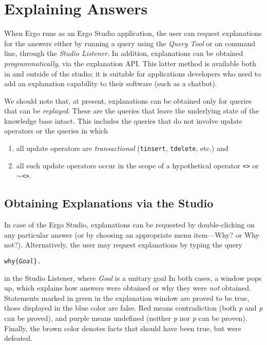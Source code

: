 
\section{Explaining Answers}\label{sec-expl-answers}

When Ergo runs as an Ergo Studio application,
the user can request explanations for the answers either by running a query
using the \emph{Query Tool}  or on command line, through the \emph{Studio
Listener}.  In addition, explanations can be obtained
\emph{programmatically}, via the explanation API. This latter method is
available both in and outside of the studio; it is
suitable for applications developers who need to add an explanation
capability to their software (such as a chatbot).

We should note that, at present, explanations can be
obtained only for queries that can be \emph{replayed}. These are the
queries that leave the underlying state of the knowledge base intact.
This includes the
queries that do not involve update operators or the queries in which
\begin{enumerate}
\item  all update operators are \emph{transactional} (\texttt{tinsert},
  \texttt{tdelete}, etc.) and
\item all such update operators occur in the scope of a hypothetical
  operator \texttt{<>} or \texttt{$\sim$<>}.  
\end{enumerate}

\subsection{Obtaining Explanations via the Studio}

In case of the Ergo Studio, explanations can be requested by
double-clicking on any particular answer (or by choosing an appropriate
menu item---Why? or Why not?). Alternatively, the user may
request explanations by typing the query
\begin{alltt}
   why\{\textnormal{\emph{Goal}}\}. 
\end{alltt}
in the Studio Listener, where \emph{Goal} is a unitary goal  In both cases, a window pops up, which explains how
answers were obtained or why they were \emph{not} obtained.
Statements marked in {\color{green}green} in the explanation window are proved to be true,
those displayed in the {\color{blue}blue color} are false. {\color{red}Red}
means contradiction (both
\emph{p} and \emph{\RULELOGNEG p} can be proved), and {\color{purple}purple}
means undefined
(neither \emph{p} nor \emph{\RULELOGNAF p}  can be proven).
Finally, the {\color{brown}brown color}
denotes facts that should have been true, but were defeated.

